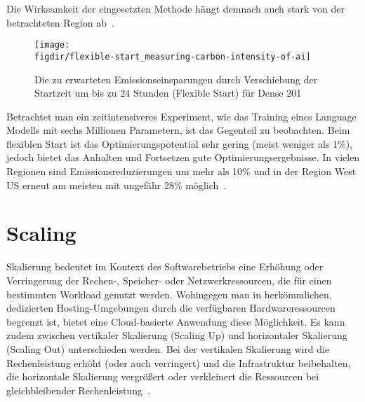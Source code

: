Die Wirksamkeit der eingesetzten Methode hängt demnach auch stark von der betrachteten Region ab~\cite{Dodge.06212022}.
\begin{figure}
 \caption{Die zu erwarteten Emissionseinsparungen durch Verschiebung der Startzeit um bis zu 24 Stunden (Flexible Start) für Dense 201~\cite{Dodge.06212022}}
 {\texttt{[image: \\figdir/flexible-start\_measuring-carbon-intensity-of-ai]}}
 \label{FIG:flexible-start}
\end{figure}
Betrachtet man ein zeitintensiveres Experiment, wie das Training eines Language Modells mit sechs Millionen Parametern, ist das Gegenteil zu beobachten.
Beim flexiblen Start ist das Optimierungspotential sehr gering (meist weniger als 1\%), jedoch bietet das Anhalten und Fortsetzen gute Optimierungsergebnisse.
In vielen Regionen sind Emissionsreduzierungen um mehr als 10\% und in der Region West US erneut am meisten mit ungefähr 28\% möglich~\cite{Dodge.06212022}.

\section{Scaling}
Skalierung bedeutet im Kontext des Softwarebetriebs eine Erhöhung oder Verringerung der Rechen-, Speicher- oder Netzwerkressourcen, die für einen bestimmten Workload genutzt werden.
Wohingegen man in herkömmlichen, dedizierten Hosting-Umgebungen durch die verfügbaren Hardwareressourcen begrenzt ist, bietet eine Cloud-basierte Anwendung diese Möglichkeit.
Es kann zudem zwischen vertikaler Skalierung (Scaling Up) und horizontaler Skalierung (Scaling Out) unterschieden werden.
Bei der vertikalen Skalierung wird die Rechenleistung erhöht (oder auch verringert) und die Infrastruktur beibehalten, die horizontale Skalierung vergrößert oder verkleinert die Ressourcen bei gleichbleibender Rechenleistung~\cite{AlibabaCloudCommunity.20240118T09:19:15.000Z}.
